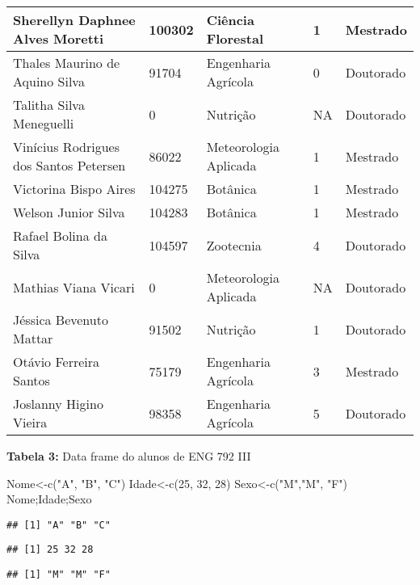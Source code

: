 \documentclass[
]{book}
\newenvironment{Shaded}{\begin{snugshade}}{\end{snugshade}}
\newcommand{\DecValTok}[1]{\textcolor[rgb]{0.00,0.00,0.81}{#1}}
\newcommand{\FunctionTok}[1]{\textcolor[rgb]{0.00,0.00,0.00}{#1}}
\newcommand{\NormalTok}[1]{#1}
\newcommand{\OtherTok}[1]{\textcolor[rgb]{0.56,0.35,0.01}{#1}}
\newcommand{\StringTok}[1]{\textcolor[rgb]{0.31,0.60,0.02}{#1}}
\begin{document}
\begin{tabular}{l|l|l|l|l}
\hline
Sherellyn Daphnee Alves Moretti & 100302 & Ciência Florestal & 1 & Mestrado\\
\hline
Thales Maurino de Aquino Silva & 91704 & Engenharia Agrícola & 0 & Doutorado\\
\hline
Talitha Silva Meneguelli & 0 & Nutrição & NA & Doutorado\\
\hline
Vinícius Rodrigues dos Santos Petersen & 86022 & Meteorologia Aplicada & 1 & Mestrado\\
\hline
Victorina Bispo Aires & 104275 & Botânica & 1 & Mestrado\\
\hline
Welson Junior Silva & 104283 & Botânica & 1 & Mestrado\\
\hline
Rafael Bolina da Silva & 104597 & Zootecnia & 4 & Doutorado\\
\hline
Mathias Viana Vicari & 0 & Meteorologia Aplicada & NA & Doutorado\\
\hline
Jéssica Bevenuto Mattar & 91502 & Nutrição & 1 & Doutorado\\
\hline
Otávio Ferreira Santos & 75179 & Engenharia Agrícola & 3 & Mestrado\\
\hline
Joslanny Higino Vieira & 98358 & Engenharia Agrícola & 5 & Doutorado\\
\hline
\end{tabular}

\textbf{Tabela 3:} Data frame do alunos de ENG 792 III

\begin{Shaded}
\begin{Highlighting}[]
\NormalTok{Nome}\OtherTok{\textless{}{-}}\FunctionTok{c}\NormalTok{(}\StringTok{"A"}\NormalTok{, }\StringTok{"B"}\NormalTok{, }\StringTok{"C"}\NormalTok{)}
\NormalTok{Idade}\OtherTok{\textless{}{-}}\FunctionTok{c}\NormalTok{(}\DecValTok{25}\NormalTok{, }\DecValTok{32}\NormalTok{, }\DecValTok{28}\NormalTok{)}
\NormalTok{Sexo}\OtherTok{\textless{}{-}}\FunctionTok{c}\NormalTok{(}\StringTok{"M"}\NormalTok{,}\StringTok{"M"}\NormalTok{, }\StringTok{"F"}\NormalTok{)}
\NormalTok{Nome;Idade;Sexo}
\end{Highlighting}
\end{Shaded}

\begin{verbatim}
## [1] "A" "B" "C"
\end{verbatim}

\begin{verbatim}
## [1] 25 32 28
\end{verbatim}

\begin{verbatim}
## [1] "M" "M" "F"
\end{verbatim}
\end{document}
